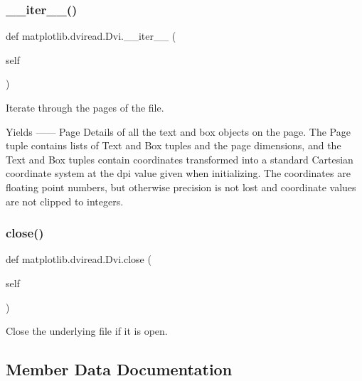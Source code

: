 \subsubsection{\texorpdfstring{\+\_\+\+\_\+iter\+\_\+\+\_\+()}{\_\_iter\_\_()}}
{\footnotesize\ttfamily def matplotlib.\+dviread.\+Dvi.\+\_\+\+\_\+iter\+\_\+\+\_\+ (\begin{DoxyParamCaption}\item[{}]{self }\end{DoxyParamCaption})}

\begin{DoxyVerb}Iterate through the pages of the file.

Yields
------
Page
    Details of all the text and box objects on the page.
    The Page tuple contains lists of Text and Box tuples and
    the page dimensions, and the Text and Box tuples contain
    coordinates transformed into a standard Cartesian
    coordinate system at the dpi value given when initializing.
    The coordinates are floating point numbers, but otherwise
    precision is not lost and coordinate values are not clipped to
    integers.
\end{DoxyVerb}
 \mbox{\label{classmatplotlib_1_1dviread_1_1Dvi_a4aba2d0e54333f36e69b83cba14c280f}} 
\subsubsection{\texorpdfstring{close()}{close()}}
{\footnotesize\ttfamily def matplotlib.\+dviread.\+Dvi.\+close (\begin{DoxyParamCaption}\item[{}]{self }\end{DoxyParamCaption})}

\begin{DoxyVerb}Close the underlying file if it is open.\end{DoxyVerb}
 

\subsection{Member Data Documentation}
\mbox{\label{classmatplotlib_1_1dviread_1_1Dvi_abe12ec8b95487997b9423a4eaf714399}} 
